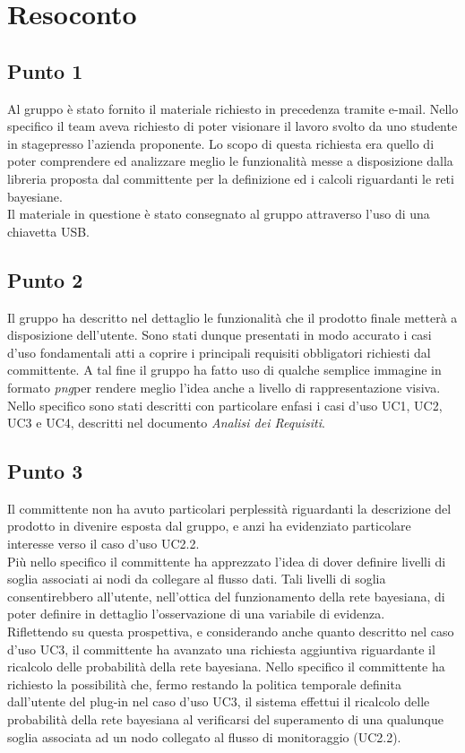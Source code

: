 \section{Resoconto}

\subsection{Punto 1}
Al gruppo è stato fornito il materiale richiesto in precedenza tramite e-mail.
Nello specifico il team aveva richiesto di poter visionare il lavoro svolto da uno studente in stage\glossario presso l'azienda proponente. Lo scopo di questa richiesta era quello di poter comprendere ed analizzare meglio le funzionalità messe a disposizione dalla libreria proposta dal committente per la definizione ed i calcoli riguardanti le reti bayesiane.\\
Il materiale in questione è stato consegnato al gruppo attraverso l'uso di una chiavetta USB.

\subsection{Punto 2}
Il gruppo ha descritto nel dettaglio le funzionalità che il prodotto finale metterà a disposizione dell'utente. Sono stati dunque presentati in modo accurato i casi d'uso fondamentali atti a coprire i principali requisiti obbligatori richiesti dal committente. A tal fine il gruppo ha fatto uso di qualche semplice immagine in formato \textit{png}\glossario per rendere meglio l'idea anche a livello di rappresentazione visiva.\\
Nello specifico sono stati descritti con particolare enfasi i casi d'uso UC1, UC2, UC3 e UC4, descritti nel documento \textit{Analisi dei Requisiti}.

\subsection{Punto 3}
Il committente non ha avuto particolari perplessità riguardanti la descrizione del prodotto in divenire esposta dal gruppo, e anzi ha evidenziato particolare interesse verso il caso d'uso UC2.2.\\
Più nello specifico il committente ha apprezzato l'idea di dover definire livelli di soglia associati ai nodi da collegare al flusso dati. Tali livelli di soglia consentirebbero all'utente, nell'ottica del funzionamento della rete bayesiana, di poter definire in dettaglio l'osservazione di una variabile di evidenza.\\
Riflettendo su questa prospettiva, e considerando anche quanto descritto nel caso d'uso UC3, il committente ha avanzato una richiesta aggiuntiva riguardante il ricalcolo delle probabilità della rete bayesiana.
Nello specifico il committente ha richiesto la possibilità che, fermo restando la politica temporale definita dall'utente del plug-in nel caso d'uso UC3, il sistema effettui il ricalcolo delle probabilità della rete bayesiana al verificarsi del superamento di una qualunque soglia associata ad un nodo collegato al flusso di monitoraggio (UC2.2).